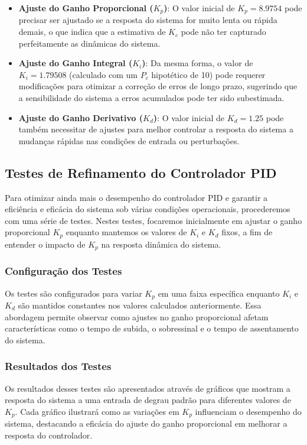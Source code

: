 \begin{itemize}
    \item \textbf{Ajuste do Ganho Proporcional (\( K_p \))}: O valor inicial de \( K_p = 8.9754 \) pode precisar ser ajustado se a resposta do sistema for muito lenta ou rápida demais, o que indica que a estimativa de \( K_c \) pode não ter capturado perfeitamente as dinâmicas do sistema.
    \item \textbf{Ajuste do Ganho Integral (\( K_i \))}: Da mesma forma, o valor de \( K_i = 1.79508 \) (calculado com um \( P_c \) hipotético de 10) pode requerer modificações para otimizar a correção de erros de longo prazo, sugerindo que a sensibilidade do sistema a erros acumulados pode ter sido subestimada.
    \item \textbf{Ajuste do Ganho Derivativo (\( K_d \))}: O valor inicial de \( K_d = 1.25 \) pode também necessitar de ajustes para melhor controlar a resposta do sistema a mudanças rápidas nas condições de entrada ou perturbações.
\end{itemize}

\subsection{Testes de Refinamento do Controlador PID}
Para otimizar ainda mais o desempenho do controlador PID e garantir a eficiência e eficácia do sistema sob várias condições operacionais, procederemos com uma série de testes. Nestes testes, focaremos inicialmente em ajustar o ganho proporcional \( K_p \) enquanto mantemos os valores de \( K_i \) e \( K_d \) fixos, a fim de entender o impacto de \( K_p \) na resposta dinâmica do sistema.

\subsubsection{Configuração dos Testes}
Os testes são configurados para variar \( K_p \) em uma faixa específica enquanto \( K_i \) e \( K_d \) são mantidos constantes nos valores calculados anteriormente. Essa abordagem permite observar como ajustes no ganho proporcional afetam características como o tempo de subida, o sobressinal e o tempo de assentamento do sistema.

\subsubsection{Resultados dos Testes}
Os resultados desses testes são apresentados através de gráficos que mostram a resposta do sistema a uma entrada de degrau padrão para diferentes valores de \( K_p \). Cada gráfico ilustrará como as variações em \( K_p \) influenciam o desempenho do sistema, destacando a eficácia do ajuste do ganho proporcional em melhorar a resposta do controlador.


